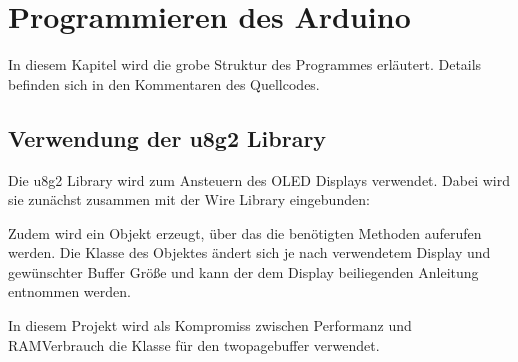 \documentclass[letterpaper,10pt,ngerman]{sphinxmanual}
\begin{document}
\chapter{Programmieren des Arduino}
\label{\detokenize{programming:programmieren-des-arduino}}\label{\detokenize{programming::doc}}
In diesem Kapitel wird die grobe Struktur des Programmes erläutert. Details
befinden sich in den Kommentaren des Quellcodes.


\section{Verwendung der u8g2 Library}
\label{\detokenize{programming:verwendung-der-u8g2-library}}
Die u8g2 Library wird zum Ansteuern des OLED Displays verwendet. Dabei wird
sie zunächst zusammen mit der Wire Library eingebunden:

\begin{sphinxVerbatim}[commandchars=\\\{\}]
 
 
\end{sphinxVerbatim}

Zudem wird ein Objekt erzeugt, über das die benötigten Methoden auferufen
werden. Die Klasse des Objektes ändert sich je nach verwendetem Display und
gewünschter Buffer Größe und kann der dem Display beiliegenden Anleitung
entnommen werden.

\begin{sphinxVerbatim}[commandchars=\\\{\}]
   
\end{sphinxVerbatim}

In diesem Projekt wird als Kompromiss zwischen Performanz und RAM\sphinxhyphen{}Verbrauch
die Klasse für den two\sphinxhyphen{}page\sphinxhyphen{}buffer verwendet.
\end{document}
